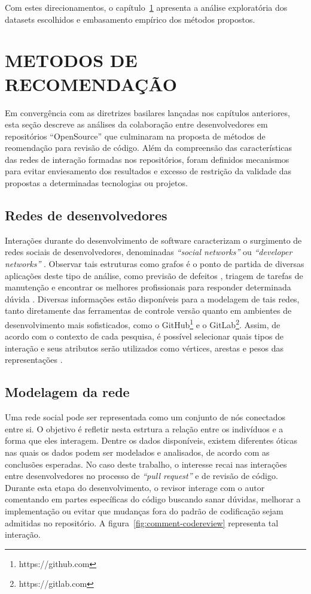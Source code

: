 \documentclass[12pt,openany,oneside,a4paper,english,brazil]{abntbibufjf}
\begin{document}
Com estes direcionamentos, o capítulo~\ref{chap:metodos} apresenta a análise exploratória dos datasets escolhidos e embasamento empírico dos métodos propostos.

\chapter{METODOS DE RECOMENDAÇÃO}\label{chap:metodos}

Em convergência com as diretrizes basilares lançadas nos capítulos anteriores, esta seção descreve as análises da colaboração entre desenvolvedores em repositórios ``OpenSource'' que culminaram na proposta de métodos de reomendação para revisão de código. Além da compreensão das características das redes de interação formadas nos repositórios, foram definidos mecanismos para evitar enviesamento dos resultados e excesso de restrição da validade das propostas a determinadas tecnologias ou projetos.

\section{Redes de desenvolvedores}

Interações durante do desenvolvimento de software caracterizam o surgimento de redes sociais de desenvolvedores, denominadas \textit{``social networks''} ou \textit{``developer networks''} \cite{lopez2004}. Observar tais estruturas como grafos é o ponto de partida de diversas aplicações deste tipo de análise, como previsão de defeitos \cite{meneely2008}, triagem de tarefas de manutenção \cite{zhang2012} e encontrar os melhores profissionais para responder determinada dúvida \cite{li2010, horta2019}. Diversas informações estão disponíveis para a modelagem de tais redes, tanto diretamente das ferramentas de controle versão quanto em ambientes de desenvolvimento mais sofisticados, como o GitHub\footnote{https://github.com} e o GitLab\footnote{https://gitlab.com}. Assim, de acordo com o contexto de cada pesquisa, é possível selecionar quais tipos de interação e seus atributos serão utilizados como vértices, arestas e pesos das representações \cite{schettino2019a}.

\section{Modelagem da rede}\label{sec:modelagem}
Uma rede social pode ser representada como um conjunto de nós conectados entre si. O objetivo é refletir nesta estrtura a relação entre os indivíduos e a forma que eles interagem. Dentre os dados disponíveis, existem diferentes óticas nas quais os dados podem ser modelados e analisados, de acordo com as conclusões esperadas. No caso deste trabalho, o interesse recai nas interações entre desenvolvedores no processo de \textit{``pull request''} e de revisão de código. Durante esta etapa do desenvolvimento, o revisor interage com o autor comentando em partes específicas do código buscando sanar dúvidas, melhorar a implementação ou evitar que mudanças fora do padrão de codificação sejam admitidas no repositório. A figura~\ref{fig:comment-codereview} representa tal interação.
\end{document}
